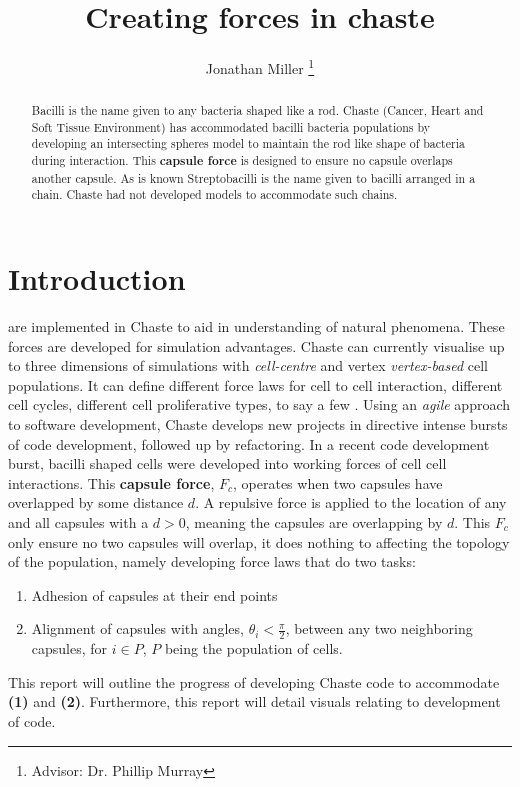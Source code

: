 \documentclass[journal, a4paper]{IEEEtran}
\begin{document}
	\title{Creating forces in chaste}
	\author{Jonathan Miller
	\thanks{Advisor: Dr. Phillip Murray}}
	\maketitle

\begin{abstract}
	 Bacilli is the name given to any bacteria shaped like a rod. Chaste (Cancer, Heart and Soft Tissue Environment) has accommodated bacilli bacteria populations by developing an intersecting spheres model to maintain the rod like shape of bacteria during interaction. This \textbf{capsule force} is designed to ensure no capsule overlaps another capsule. As is known Streptobacilli is the name given to bacilli arranged in a chain. Chaste had not developed models to accommodate such chains.
\end{abstract}

\section{Introduction}
	 are implemented in Chaste to aid in understanding of natural phenomena. These forces are developed for simulation advantages. Chaste can currently visualise up to three dimensions of simulations with \textit{cell-centre} and vertex \textit{vertex-based} cell populations. It can define different force laws for cell to cell interaction, different cell cycles, different cell proliferative types, to say a few \cite{ChasteCell}. Using an \textit{agile} approach to software development, Chaste develops new projects in directive intense bursts of code development, followed up by refactoring. In a recent code development burst, bacilli shaped cells were developed into working forces of cell cell interactions. This \textbf{capsule force}, $F_c$, operates when two capsules have overlapped by some distance $d$. A repulsive force is applied to the location of any and all capsules with a $d > 0$, meaning the capsules are overlapping by $d$. This $F_c$ only ensure no two capsules will overlap, it does nothing to affecting the topology of the population, namely developing force laws that do two tasks:
	\begin{enumerate}
	    \item Adhesion of capsules at their end points
	    \item Alignment of capsules with angles, $\theta_i < \frac{\pi}{2}$, between any two neighboring capsules, for $i\in P$, $P$ being the population of cells.
	\end{enumerate}
    This report will outline the progress of developing Chaste code to accommodate \textbf{(1)} and \textbf{(2)}. Furthermore, this report will detail visuals relating to development of code. 
\end{document}
